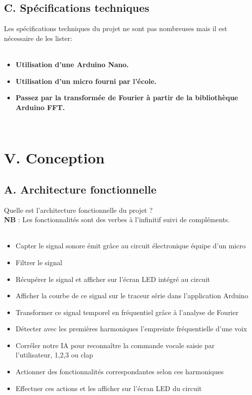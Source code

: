 \documentclass[a4paper,11pt]{book}
\begin{document}
\subsection*{C. Spécifications techniques}
Les spécifications techniques du projet ne sont pas nombreuses mais il est nécessaire de les lister: \\ \\
\begin{itemize}
        \item \textbf{Utilisation d'une Arduino Nano.}
        \item \textbf{Utilisation d'un micro fourni par l'école.}
        \item \textbf{Passez par la transformée de Fourier à partir de la bibliothèque Arduino FFT.} 
\end{itemize}
\\

\newpage
\section*{V. Conception}
\subsection*{A. Architecture fonctionnelle}
Quelle est l’architecture fonctionnelle du projet ? \\
\noindent \textbf{NB} : Les fonctionnalités sont des verbes à l’infinitif suivi de compléments.\\ \\
\begin{itemize}
        \item Capter le signal sonore émit grâce au circuit électronique équipe d'un micro
\indent \item Filtrer le signal
\indent \item Récupérer le signal et afficher sur l'écran LED intégré au circuit 
\indent \item Afficher la courbe de ce signal sur le traceur série dans l'application Arduino 
\indent \item Transformer ce signal temporel en fréquentiel grâce à l'analyse de Fourier 
\indent \item Détecter avec les premières harmoniques l'empreinte fréquentielle d'une voix
\indent \item Corréler notre IA pour reconnaître la commande vocale saisie par l'utilisateur, 1,2,3 ou clap 
\indent \item Actionner des fonctionnalités correspondantes selon ces harmoniques 
\indent \item Effectuer ces actions et les afficher sur l'écran LED du circuit 
\end{itemize}
\end{document}

